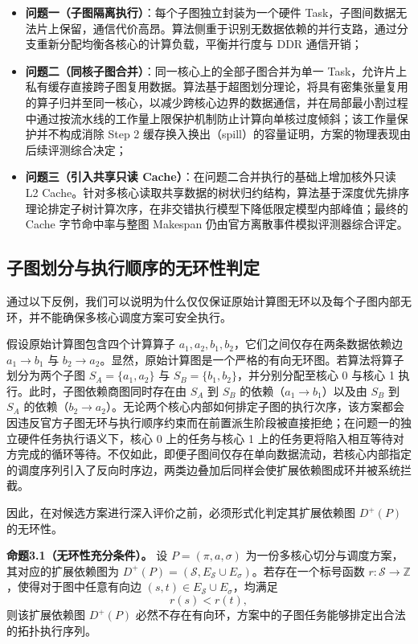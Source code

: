 \documentclass[anonymous,notoc]{gmcm2026}
\providecommand{\tightlist}{\setlength{\itemsep}{0pt}\setlength{\parskip}{0pt}}
\begin{document}
\begin{itemize}
\tightlist
\item
  \textbf{问题一（子图隔离执行）}：每个子图独立封装为一个硬件 Task，子图间数据无法片上保留，通信代价高昂。算法侧重于识别无数据依赖的并行支路，通过分支重新分配均衡各核心的计算负载，平衡并行度与 DDR 通信开销；
\item
  \textbf{问题二（同核子图合并）}：同一核心上的全部子图合并为单一 Task，允许片上私有缓存直接跨子图复用数据。算法基于超图划分理论，将具有密集张量复用的算子归并至同一核心，以减少跨核心边界的数据通信，并在局部最小割过程中通过按流水线的工作量上限保护机制防止计算向单核过度倾斜；该工作量保护并不构成消除 Step 2 缓存换入换出（spill）的容量证明，方案的物理表现由后续评测综合决定；
\item
  \textbf{问题三（引入共享只读 Cache）}：在问题二合并执行的基础上增加核外只读 L2 Cache。针对多核心读取共享数据的树状归约结构，算法基于深度优先排序理论排定子树计算次序，在非交错执行模型下降低限定模型内部峰值；最终的 Cache 字节命中率与整图 Makespan 仍由官方离散事件模拟评测器综合评定。
\end{itemize}

\subsection{子图划分与执行顺序的无环性判定}

通过以下反例，我们可以说明为什么仅仅保证原始计算图无环以及每个子图内部无环，并不能确保多核心调度方案可安全执行。

假设原始计算图包含四个计算算子 \(a_1, a_2, b_1, b_2\)，它们之间仅存在两条数据依赖边 \(a_1 \to b_1\) 与 \(b_2 \to a_2\)。显然，原始计算图是一个严格的有向无环图。若算法将算子划分为两个子图 \(S_A = \{a_1, a_2\}\) 与 \(S_B = \{b_1, b_2\}\)，并分别分配至核心 0 与核心 1 执行。此时，子图依赖商图同时存在由 \(S_A\) 到 \(S_B\) 的依赖（\(a_1 \to b_1\)）以及由 \(S_B\) 到 \(S_A\) 的依赖（\(b_2 \to a_2\)）。无论两个核心内部如何排定子图的执行次序，该方案都会因违反官方子图无环与执行顺序约束而在前置派生阶段被直接拒绝；在问题一的独立硬件任务执行语义下，核心 0 上的任务与核心 1 上的任务更将陷入相互等待对方完成的循环等待。不仅如此，即便子图间仅存在单向数据流动，若核心内部指定的调度序列引入了反向时序边，两类边叠加后同样会使扩展依赖图成环并被系统拦截。

因此，在对候选方案进行深入评价之前，必须形式化判定其扩展依赖图 \(D^+(P)\) 的无环性。

\textbf{命题3.1（无环性充分条件）。} 设 \(P = (\pi, a, \sigma)\) 为一份多核心切分与调度方案，其对应的扩展依赖图为 \(D^+(P) = (\mathcal{S}, E_{\mathcal{S}} \cup E_\sigma)\)。若存在一个标号函数 \(r: \mathcal{S} \to \mathbb{Z}\)，使得对于图中任意有向边 \((s, t) \in E_{\mathcal{S}} \cup E_\sigma\)，均满足 \begin{equation}
r(s) < r(t),
\end{equation} 则该扩展依赖图 \(D^+(P)\) 必然不存在有向环，方案中的子图任务能够排定出合法的拓扑执行序列。
\end{document}
